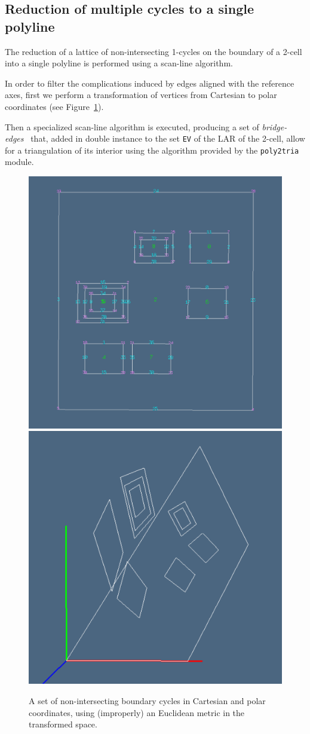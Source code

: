 \documentclass[11pt,oneside]{article}    %
\begin{document}
\subsection{Reduction of multiple cycles to a single polyline}
\label{sec:singlepolyline}

The reduction of a lattice of non-intersecting 1-cycles on the boundary of a 2-cell into a single polyline is performed using a scan-line algorithm.

In order to filter the complications induced by edges aligned with the reference axes, first we perform a transformation of vertices from Cartesian to polar coordinates (see Figure~\ref{fig:polarholes}).

Then a specialized scan-line algorithm is executed, producing a set of \emph{bridge-edges}~\cite{Yamaguchi:85} that, added in double instance to the set \texttt{EV} of the LAR of the 2-cell, allow for a triangulation of its interior using the algorithm provided by the \texttt{poly2tria} module.

\begin{figure}[htbp] %
   \centering
   \includegraphics[height=0.33\linewidth,width=0.33\linewidth]{images/lattice1} 
   \includegraphics[height=0.33\linewidth,width=0.33\linewidth]{images/polarholes} 
   \caption{A set of non-intersecting boundary cycles in Cartesian and polar coordinates, using (improperly) an Euclidean metric in the transformed space.}
   \label{fig:polarholes}
\end{figure}
\end{document}
